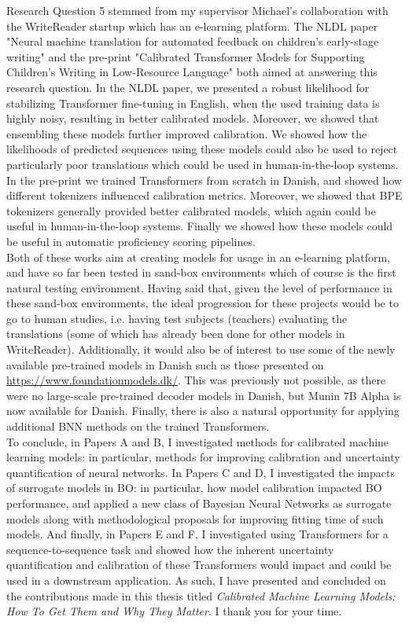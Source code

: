\noindent Research Question 5 stemmed from my supervisor Michael's collaboration with the WriteReader startup which has an e-learning platform. The NLDL paper "Neural machine translation for
automated feedback on children’s
early-stage writing" and the pre-print "Calibrated Transformer Models for
Supporting Children’s Writing in
Low-Resource Language" both aimed at answering this research question. In the NLDL paper, we presented a robust likelihood for stabilizing Transformer fine-tuning in English, when the used training data is highly noisy, resulting in better calibrated models. Moreover, we showed that ensembling these models further improved calibration. We showed how the likelihoods of predicted sequences using these models could also be used to reject particularly poor translations which could be used in human-in-the-loop systems. In the pre-print we trained Transformers from scratch in Danish, and showed how different tokenizers influenced calibration metrics. Moreover, we showed that BPE tokenizers generally provided better calibrated models, which again could be useful in human-in-the-loop systems. Finally we showed how these models could be useful in automatic proficiency scoring pipelines. \\

\noindent Both of these works aim at creating models for usage in an e-learning platform, and have so far been tested in sand-box environments which of course is the first natural testing environment. Having said that, given the level of performance in these sand-box environments, the ideal progression for these projects would be to go to human studies, i.e. having test subjects (teachers) evaluating the translations (some of which has already been done for other models in WriteReader). Additionally, it would also be of interest to use some of the newly available pre-trained models in Danish such as those presented on \url{https://www.foundationmodels.dk/}. This was previously not possible, as there were no large-scale pre-trained decoder models in Danish, but Munin 7B Alpha is now available for Danish. Finally, there is also a natural opportunity for applying additional BNN methods on the trained Transformers. \\

\noindent To conclude, in Papers A and B, I investigated methods for calibrated machine learning models: in particular, methods for improving calibration and uncertainty quantification of neural networks. In Papers C and D, I investigated the impacts of surrogate models in BO: in particular, how model calibration impacted BO performance, and applied a new class of Bayesian Neural Networks as surrogate models along with methodological proposals for improving fitting time of such models. And finally, in Papers E and F, I investigated using Transformers for a sequence-to-sequence task and showed how the inherent uncertainty quantification and calibration of these Transformers would impact and could be used in a downstream application. As such, I have presented and concluded on the contributions made in this thesis titled \textit{Calibrated Machine Learning Models: How To Get Them and Why They Matter}. I thank you for your time.